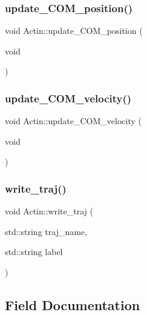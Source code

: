 \subsubsection{\texorpdfstring{update\_COM\_position()}{update\_COM\_position()}}
{\footnotesize\ttfamily void Actin\+::update\+\_\+\+C\+O\+M\+\_\+position (\begin{DoxyParamCaption}\item[{void}]{ }\end{DoxyParamCaption})\hspace{0.3cm}{\ttfamily [inline]}}

\mbox{\label{classActin_a2f171e0eab1ee13c538ca25c8cf69aa9}} 
\subsubsection{\texorpdfstring{update\_COM\_velocity()}{update\_COM\_velocity()}}
{\footnotesize\ttfamily void Actin\+::update\+\_\+\+C\+O\+M\+\_\+velocity (\begin{DoxyParamCaption}\item[{void}]{ }\end{DoxyParamCaption})\hspace{0.3cm}{\ttfamily [inline]}}

\mbox{\label{classActin_ab65dc5554a97210353818c736fd0414e}} 
\subsubsection{\texorpdfstring{write\_traj()}{write\_traj()}}
{\footnotesize\ttfamily void Actin\+::write\+\_\+traj (\begin{DoxyParamCaption}\item[{std\+::string}]{traj\+\_\+name,  }\item[{std\+::string}]{label }\end{DoxyParamCaption})}



\subsection{Field Documentation}
\mbox{\label{classActin_a575a56b45d7492503465078635e6340f}} 

